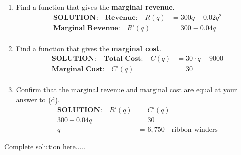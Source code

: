\begin{example}
\begin{enumerate}[leftmargin=*]
    \newpage
    \item Find a function that gives the \textbf{marginal revenue}.\\
    	\begin{displaymath}
		\begin{split}
		\textbf{SOLUTION:} \quad \textbf{Revenue:}\quad R(q) &=300q-0.02q^2\\
			\textbf{Marginal Revenue:}\quad R'(q) &=300-0.04q\\
		\end{split}
	\end{displaymath}
	
    \item Find a function that gives the \textbf{marginal cost}.\\
    	\begin{displaymath}
		\begin{split}
		\textbf{SOLUTION:} \quad \textbf{Total Cost:}\quad C(q) &=30\cdot q+9000\\
			\textbf{Marginal Cost:}\quad C'(q) &=30\\
		\end{split}
	\end{displaymath}
    \item Confirm that the \underline{marginal revenue and marginal cost} are equal at your answer to (d).\\
    	\begin{displaymath}
		\begin{split}
	\textbf{SOLUTION:} \quad	R'(q) &=C'(q)\\
	   300-0.04q &=30\\
	   q&=6,750 \quad \text{ribbon winders}
		\end{split}
	\end{displaymath}
\end{enumerate}
    \begin{sol}
    
    \end{sol}
    \begin{solL}
    Complete solution here.....
    
    \end{solL}
    
\end{example}


